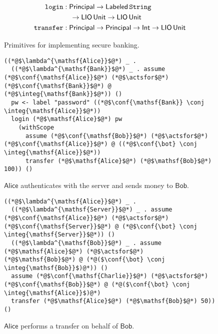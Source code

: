 \begin{figure}
    \centering
    \begin{align*}
\mathtt{login}&: \mathsf{Principal} \to \mathsf{Labeled}\,\mathtt{String} \\ &\quad \to \mathsf{LIO}\,\mathsf{Unit} \to \mathsf{LIO}\,\mathsf{Unit}\\
\mathtt{transfer}&: \mathsf{Principal} \to \mathsf{Principal} \to \mathsf{Int} \to \mathsf{LIO}\,\mathsf{Unit}
\end{align*}
    \caption{Primitives for implementing secure banking.}
    \label{fig:sec-banking-sigs}
\end{figure}

\begin{figure}
\centering
\begin{lstlisting}
((*@$\lambda^{\mathsf{Alice}}$@*) _ .
  ((*@$\lambda^{\mathsf{Bank}}$@*) _ . assume (*@$\conf{\mathsf{Alice}}$@*) (*@$\actsfor$@*) (*@$\conf{\mathsf{Bank}}$@*) @ (*@$\integ{\mathsf{Bank}}$@*)) ()
  pw <- label "password" ((*@$\conf{\mathsf{Bank}} \conj \integ{\mathsf{Alice}}$@*))
  login (*@$\mathsf{Alice}$@*) pw
    (withScope
      assume (*@$\conf{\mathsf{Bob}}$@*) (*@$\actsfor$@*) (*@$\conf{\mathsf{Alice}}$@*) @ ((*@$\conf{\bot} \conj \integ{\mathsf{Alice}}$@*))
      transfer (*@$\mathsf{Alice}$@*) (*@$\mathsf{Bob}$@*) 100)) ()
\end{lstlisting}
\caption{$\mathsf{Alice}$ authenticates with the server and sends money to $\mathsf{Bob}$.}
\label{fig:sec-bank-alice-send-to-bob}
\end{figure}

\begin{figure}
\centering
\begin{lstlisting}
((*@$\lambda^{\mathsf{Alice}}$@*) _ .
  ((*@$\lambda^{\mathsf{Server}}$@*) _ . assume (*@$\conf{\mathsf{Alice}}$@*) (*@$\actsfor$@*) (*@$\conf{\mathsf{Server}}$@*) @ (*@$\conf{\bot} \conj \integ{\mathsf{Server}}$@*)) ()
  ((*@$\lambda^{\mathsf{Bob}}$@*) _ . assume (*@$\mathsf{Alice}$@*) (*@$\actsfor$@*) (*@$\mathsf{Bob}$@*) @ (*@($\conf{\bot} \conj \integ{\mathsf{Bob}}$)@*)) ()
  assume (*@$\conf{\mathsf{Charlie}}$@*) (*@$\actsfor$@*) (*@$\conf{\mathsf{Bob}}$@*) @ (*@($\conf{\bot} \conj \integ{\mathsf{Alice}}$)@*)
  transfer (*@$\mathsf{Alice}$@*) (*@$\mathsf{Bob}$@*) 50)) ()
\end{lstlisting}
\caption{$\mathsf{Alice}$ performs a transfer on behalf of $\mathsf{Bob}$.}
\label{fig:sec-bank-alice-banks-for-bob}
\end{figure}


